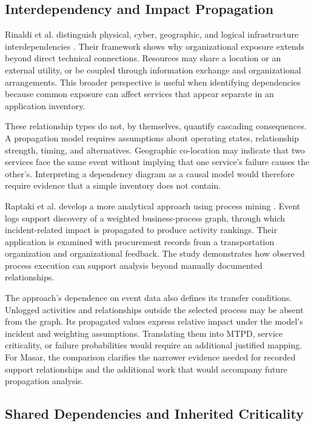 \subsection{Interdependency and Impact Propagation}
\label{sec:lr_interdependency}

Rinaldi et al. distinguish physical, cyber, geographic, and logical infrastructure interdependencies \cite{rinaldi2001interdependencies}. Their framework shows why organizational exposure extends beyond direct technical connections. Resources may share a location or an external utility, or be coupled through information exchange and organizational arrangements. This broader perspective is useful when identifying dependencies because common exposure can affect services that appear separate in an application inventory.

These relationship types do not, by themselves, quantify cascading consequences. A propagation model requires assumptions about operating states, relationship strength, timing, and alternatives. Geographic co-location may indicate that two services face the same event without implying that one service's failure causes the other's. Interpreting a dependency diagram as a causal model would therefore require evidence that a simple inventory does not contain.

Raptaki et al. develop a more analytical approach using process mining \cite{raptaki2025propagation}. Event logs support discovery of a weighted business-process graph, through which incident-related impact is propagated to produce activity rankings. Their application is examined with procurement records from a transportation organization and organizational feedback. The study demonstrates how observed process execution can support analysis beyond manually documented relationships.

The approach's dependence on event data also defines its transfer conditions. Unlogged activities and relationships outside the selected process may be absent from the graph. Its propagated values express relative impact under the model's incident and weighting assumptions. Translating them into MTPD, service criticality, or failure probabilities would require an additional justified mapping. For Masar, the comparison clarifies the narrower evidence needed for recorded support relationships and the additional work that would accompany future propagation analysis.

\subsection{Shared Dependencies and Inherited Criticality}
\label{sec:lr_criticality}


